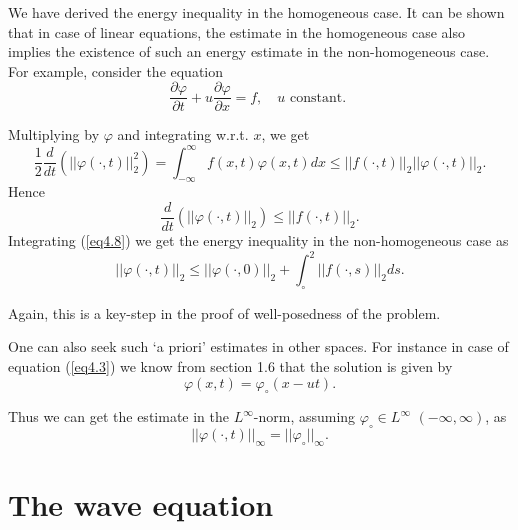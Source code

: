 \begin{remark}\label{chap4:rem4.1}
We have derived the energy inequality in the homogeneous case. It
can be shown that in case of linear equations, the estimate in the
homogeneous case also implies the existence of such an energy estimate
in the non-homogeneous case. For example, consider the equation 
\begin{equation*}
\frac{\partial \varphi}{\partial t} + u \frac{\partial
  \varphi}{\partial x} =f, \quad u \text{ constant. } \tag{4.7}\label{eq4.7}
\end{equation*}

Multiplying by $\varphi$ and integrating w.r.t. $x$, we get
$$
\frac{1}{2} \frac{d}{dt} (||\varphi (\cdot, t) ||^2_2) =
\int^\infty_{-\infty} f(x,t) \varphi(x,t) dx \leq ||f(\cdot, t)||_2
||\varphi(\cdot, t)||_2. 
$$
Hence 
\begin{equation*}
\frac{d}{dt} (||\varphi (\cdot, t) ||_2) \leq ||f(\cdot,
t)||_2. \tag{4.8} \label{eq4.8}
\end{equation*}
Integrating (\ref{eq4.8}) we get the energy inequality in the non-homogeneous
case as
\begin{equation*}
||\varphi (\cdot, t) ||_2 \leq ||\varphi (\cdot, 0) ||_2 +
\int^2_\circ ||f(\cdot, s) ||_2 ds.\tag{4.9}\label{eq4.9}
\end{equation*}

Again, this is a key-step in the proof of well-posedness of the
problem. 
\end{remark}

\begin{remark}\label{chap4:rem4.2}
One can also seek such `a priori' estimates in other spaces. For
instance in case of equation (\ref{eq4.3}) we know from section 1.6 that the
solution is given by
\begin{equation*}
\varphi (x,t) = \varphi_\circ (x-ut). 
\tag{4.10}\label{eq4.10}
\end{equation*}

Thus we can get the estimate in the $L^\infty$-norm, assuming
$\varphi_\circ \in L^\infty$ $(-\infty, \infty)$, as 
\begin{equation*}
||\varphi (\cdot , t)||_\infty = ||\varphi_\circ||_\infty. 
\tag{4.11}\label{eq4.11}
\end{equation*}\pageoriginale 
\end{remark}

\section{The wave equation}\label{chap4:sec4.3}

